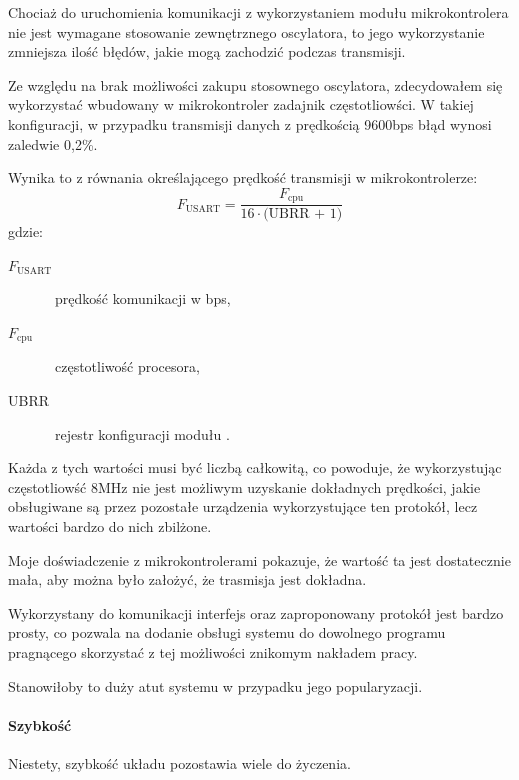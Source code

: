 Chociaż do uruchomienia komunikacji z wykorzystaniem modułu  mikrokontrolera nie jest wymagane stosowanie zewnętrznego oscylatora, to jego wykorzystanie zmniejsza ilość błędów, jakie mogą zachodzić podczas transmisji.

Ze względu na brak możliwości zakupu stosownego oscylatora, zdecydowałem się wykorzystać wbudowany w mikrokontroler zadajnik częstotliowści. W takiej konfiguracji, w przypadku transmisji danych z prędkością 9600bps błąd wynosi zaledwie 0,2\%.\label{sec:usart_error}

Wynika to z równania określającego prędkość transmisji w mikrokontrolerze:
\begin{equation}
F_\textrm{USART} = \frac{F_\textrm{cpu}}{16 \cdot \textrm{(UBRR + 1)}}
\end{equation}
gdzie:
\begin{description}
  \item[$F_\textrm{USART}$] \ppauza~prędkość komunikacji w bps,
  \item[$F_\textrm{cpu}$] \ppauza~częstotliwość procesora,
  \item[UBRR] \ppauza~rejestr konfiguracji modułu .
\end{description}

Każda z tych wartości musi być liczbą całkowitą, co powoduje, że wykorzystując częstotliowść 8MHz nie jest możliwym uzyskanie dokładnych prędkości, jakie obsługiwane są przez pozostałe urządzenia wykorzystujące ten protokół, lecz wartości bardzo do nich zbilżone.


Moje doświadczenie z mikrokontrolerami pokazuje, że wartość ta jest dostatecznie mała, aby można było założyć, że trasmisja jest dokładna.

Wykorzystany do komunikacji interfejs oraz zaproponowany protokół jest bardzo prosty, co pozwala na dodanie obsługi systemu do dowolnego programu pragnącego skorzystać z tej możliwości znikomym nakładem pracy.

Stanowiłoby to duży atut systemu w przypadku jego popularyzacji.

\paragraph{Szybkość}
Niestety, szybkość układu pozostawia wiele do życzenia.

